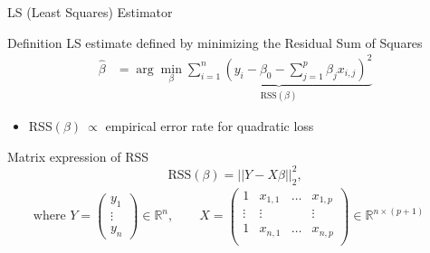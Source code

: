 \documentclass[compress, smaller, serif, 9pt]{beamer}
\begin{document}
\begin{frame}{LS (Least Squares) Estimator}

\begin{block}{Definition}
 LS estimate defined by minimizing the Residual Sum of Squares 
\begin{align*}
 \widehat{\beta}&= \arg \min_{\beta} \underbrace{\sum_{i=1}^n \left(y_i- \beta_0 - \sum_{j=1}^p \beta_j x_{i,j} \right)^2}_{\textrm{RSS}(\beta)} 
\end{align*}
\vspace{-3mm}
\begin{itemize}
 \item RSS$(\beta) \ \propto$ empirical error rate for quadratic loss
\end{itemize}

\end{block}


\begin{block}{Matrix expression of RSS}
$$\textrm{RSS}(\beta) = || Y - X \beta ||_2^2,$$
\begin{align*}
\textrm{where }
 Y= \begin{pmatrix} y_1 \\ \vdots \\ y_n \end{pmatrix} \in \mathbb{R}^n, 
 \qquad 
 X= \begin{pmatrix}
     1 & x_{1,1} & \ldots & x_{1,p} \\
     \vdots & \vdots & & \vdots\\
     1 & x_{n,1} & \ldots & x_{n,p} \\
    \end{pmatrix}\in \mathbb{R}^{n\times(p+1)}
\quad
\end{align*}
\end{block}
\end{frame}
\end{document}
